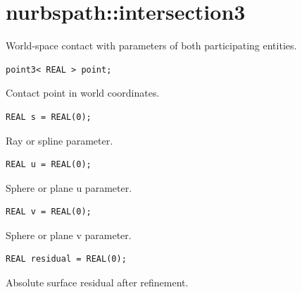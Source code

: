 \section{nurbspath::intersection3}
World-space contact with parameters of both participating entities.
\par\noindent\begin{minipage}{\linewidth}
\begin{lstlisting}[style=apireference]
point3< REAL > point;
\end{lstlisting}
{\footnotesize Contact point in world coordinates.\par}
\end{minipage}\par\vspace{1pt}
\par\noindent\begin{minipage}{\linewidth}
\begin{lstlisting}[style=apireference]
REAL s = REAL(0);
\end{lstlisting}
{\footnotesize Ray or spline parameter.\par}
\end{minipage}\par\vspace{1pt}
\par\noindent\begin{minipage}{\linewidth}
\begin{lstlisting}[style=apireference]
REAL u = REAL(0);
\end{lstlisting}
{\footnotesize Sphere or plane u parameter.\par}
\end{minipage}\par\vspace{1pt}
\par\noindent\begin{minipage}{\linewidth}
\begin{lstlisting}[style=apireference]
REAL v = REAL(0);
\end{lstlisting}
{\footnotesize Sphere or plane v parameter.\par}
\end{minipage}\par\vspace{1pt}
\par\noindent\begin{minipage}{\linewidth}
\begin{lstlisting}[style=apireference]
REAL residual = REAL(0);
\end{lstlisting}
{\footnotesize Absolute surface residual after refinement.\par}
\end{minipage}\par\vspace{1pt}
